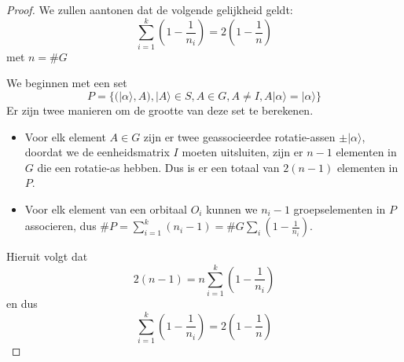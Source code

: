 \begin{proof}
We zullen aantonen dat de volgende gelijkheid geldt:
\[
\sum_{i=1}^{k} \left(1 - \frac{1}{n_i}\right) = 2(1-\frac{1}{n})
\]
met \(n = \#G\)

We beginnen met een set
\[
P = \{(|\alpha\rangle, A), |A\rangle \in S, A \in G, A \neq I, A|\alpha\rangle = |\alpha\rangle\}
\]
Er zijn twee manieren om de grootte van deze set te berekenen.
\begin{itemize}
    \item[1.] Voor elk element \(A \in G\) zijn er twee geassocieerdee rotatie-assen \(\pm |\alpha\rangle\),
    doordat we de eenheidsmatrix \(I \) moeten uitsluiten, zijn er \(n-1\) elementen in \(G\) die een rotatie-as hebben. Dus is er een totaal van \(2(n-1)\) elementen in \(P\).
    \item[2.] Voor elk element van een orbitaal \(O_i\) kunnen we \(n_i -1\) groepselementen in \(P\) associeren,
    dus \(\# P = \sum_{i=1}^{k} (n_i - 1) = \#G \sum_{i}(1-\frac{1}{n_i})\).
\end{itemize}
Hieruit volgt dat
\[2(n-1) = n \sum_{i=1}^{k} (1-\frac{1}{n_i})\]
en dus
\[\sum_{i=1}^{k} (1-\frac{1}{n_i}) = 2(1-\frac{1}{n})\]
\end{proof}
